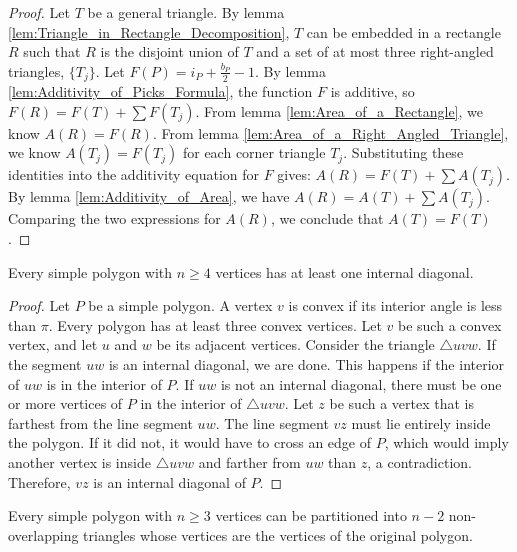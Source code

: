 \begin{proof}
    Let $T$ be a general triangle. By lemma \ref{lem:Triangle_in_Rectangle_Decomposition}, $T$ can be embedded in a rectangle $R$ such that $R$ is the disjoint union of $T$ and a set of at most three right-angled triangles, $\{T_j\}$.
    Let $F(P) = i_P + \frac{b_P}{2} - 1$. By lemma \ref{lem:Additivity_of_Picks_Formula}, the function $F$ is additive, so $F(R) = F(T) + \sum F(T_j)$.
    From lemma \ref{lem:Area_of_a_Rectangle}, we know $A(R) = F(R)$.
    From lemma \ref{lem:Area_of_a_Right_Angled_Triangle}, we know $A(T_j) = F(T_j)$ for each corner triangle $T_j$.
    Substituting these identities into the additivity equation for $F$ gives: $A(R) = F(T) + \sum A(T_j)$.
    By lemma \ref{lem:Additivity_of_Area}, we have $A(R) = A(T) + \sum A(T_j)$.
    Comparing the two expressions for $A(R)$, we conclude that $A(T) = F(T)$.
\end{proof}

\begin{lemma}
    \label{lem:Existence_of_Internal_Diagonal}
    Every simple polygon with $n \ge 4$ vertices has at least one internal diagonal.
\end{lemma}

\begin{proof}
    Let $P$ be a simple polygon. A vertex $v$ is convex if its interior angle is less than $\pi$. Every polygon has at least three convex vertices. Let $v$ be such a convex vertex, and let $u$ and $w$ be its adjacent vertices. Consider the triangle $\triangle uvw$.
    If the segment $uw$ is an internal diagonal, we are done. This happens if the interior of $uw$ is in the interior of $P$.
    If $uw$ is not an internal diagonal, there must be one or more vertices of $P$ in the interior of $\triangle uvw$. Let $z$ be such a vertex that is farthest from the line segment $uw$. The line segment $vz$ must lie entirely inside the polygon. If it did not, it would have to cross an edge of $P$, which would imply another vertex is inside $\triangle uvw$ and farther from $uw$ than $z$, a contradiction. Therefore, $vz$ is an internal diagonal of $P$.
\end{proof}

\begin{lemma}
    \label{lem:Polygon_Triangulation}
    Every simple polygon with $n \ge 3$ vertices can be partitioned into $n-2$ non-overlapping triangles whose vertices are the vertices of the original polygon.
\end{lemma}

